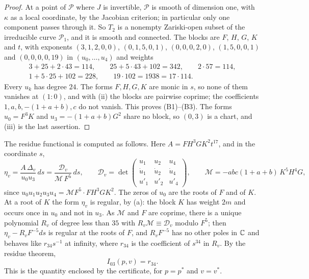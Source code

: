 \begin{proof}
At a point of $\mathcal P$ where $J$ is invertible, $\mathcal P$ is smooth of
dimension one, with $\kappa$ as a local coordinate, by the Jacobian
criterion; in particular only one component passes through it. So $T_{2}$ is
a nonempty Zariski-open subset of the irreducible curve $\mathcal P_{1}$, and
it is smooth and connected. The blocks are $F$, $H$, $G$, $K$ and $t$, with
exponents $(3,1,2,0,0)$, $(0,1,5,0,1)$, $(0,0,0,2,0)$, $(1,5,0,0,1)$ and
$(0,0,0,0,19)$ in $(u_{0},\dots,u_{4})$ and weights
\begin{gather*}
  3+25+2\cdot43=114,\qquad 25+5\cdot43+102=342,\qquad 2\cdot57=114,\\
  1+5\cdot25+102=228,\qquad 19\cdot102=1938=17\cdot114 .
\end{gather*}
Every $u_{k}$ has degree $24$. The forms $F,H,G,K$ are monic in $s$, so none
of them vanishes at $(1:0)$, and with (ii) the blocks are pairwise coprime;
the coefficients $1,a,b,-(1+a+b),c$ do not vanish. This proves (B1)--(B3).
The forms $u_{0}=F^{3}K$ and $u_{3}=-(1+a+b)G^{2}$ share no block, so
$(0,3)$ is a chart, and (iii) is the last assertion.
\end{proof}

The residue functional is computed as follows. Here $A=FH^{3}GK^{2}t^{17}$,
and in the coordinate $s$,
\[
  \eta_{v}=\frac{A\,\Delta_{v}}{u_{0}u_{3}}\,ds=\frac{\mathcal D_{v}}
  {\mathcal M\,F^{5}}\,ds,\qquad \mathcal D_{v}=\det\begin{pmatrix}u_{1}&u_{2}&
  u_{4}\\ \dot u_{1}&\dot u_{2}&\dot u_{4}\\ u'_{1}&u'_{2}&u'_{4}\end{pmatrix},
  \qquad\mathcal M=-abc(1+a+b)\,K^{5}H^{4}G,
\]
since $u_{0}u_{1}u_{2}u_{3}u_{4}=\mathcal M F^{5}\cdot FH^{3}GK^{2}$. The
zeros of $u_{0}$ are the roots of $F$ and of $K$. At a root of $K$ the form
$\eta_{v}$ is regular, by (a): the block $K$ has weight
$2m$ and occurs once in $u_{0}$ and not in $u_{3}$. As $\mathcal M$ and $F$
are coprime, there is a unique polynomial $R_{v}$ of degree less than $35$
with $R_{v}\mathcal M\equiv\mathcal D_{v}$ modulo $F^{5}$; then
$\eta_{v}-R_{v}F^{-5}ds$ is regular at the roots of $F$, and $R_{v}F^{-5}$
has no other poles in $\mathbb{C}$ and behaves like $r_{34}s^{-1}$ at infinity,
where $r_{34}$ is the coefficient of $s^{34}$ in $R_{v}$. By the residue
theorem,
\[
  I_{03}(p,v)=r_{34}.
\]
This is the quantity enclosed by the certificate, for $p=p^{*}$ and $v=v^{*}$.

